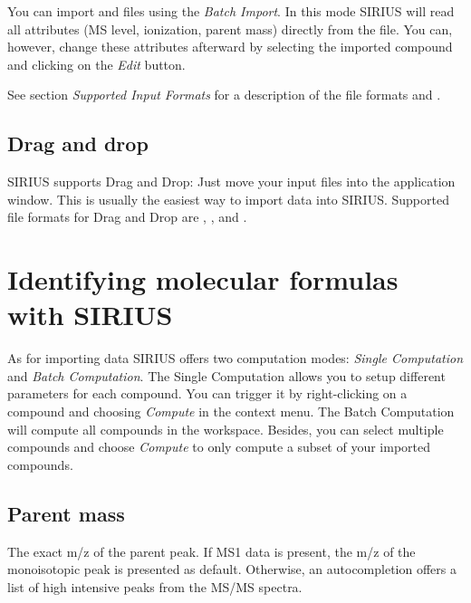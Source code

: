 \documentclass[letterpaper,10pt,openany,oneside]{sphinxmanual}
\newcommand\gui[1]{\textsl{\guilsinglleft#1\guilsinglright\xspace}}
\begin{document}
You can import  and  files using the \gui{Batch Import}. In this mode SIRIUS will read all attributes (MS level, ionization, parent mass) directly from the file. You can, however, change these attributes afterward by selecting the imported compound and clicking on the \gui{Edit} button.

See section \emph{Supported Input Formats} for a description of the file formats  and .


\subsection{Drag and drop}
\label{gui:drag-and-drop}
SIRIUS supports Drag and Drop: Just move your input files into the application window. This is usually the easiest way to import data into SIRIUS. Supported file formats for Drag and Drop are , ,  and .



\section{Identifying molecular formulas with SIRIUS}
\label{gui:identifying-molecular-formulas-with-sirius}

As for importing data SIRIUS offers two computation modes: \gui{Single 
Computation} and \gui{Batch Computation}. The Single Computation allows you 
to setup different parameters for each compound. You can trigger it by 
right-clicking on a compound and choosing \gui{Compute} in the context 
menu. The Batch Computation will compute all compounds in the workspace.
Besides, you can select multiple compounds and choose \gui{Compute} to 
only compute a subset of your imported compounds.

\begin{center}
  \centering
\end{center}


\subsection{Parent mass}
\label{gui:parent-mass}

The exact m/z of the parent peak. If MS1 data is present, the m/z of the monoisotopic peak is presented as default. Otherwise, an autocompletion offers a list of high intensive peaks from the MS/MS spectra.
\end{document}
